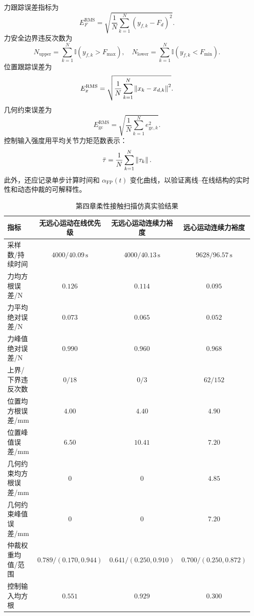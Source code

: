 力跟踪误差指标为
\begin{equation}
  E_F^{\mathrm{RMS}}=\sqrt{\frac{1}{N}\sum_{k=1}^{N}(y_{f,k}-F_d)^2} .
  \label{eq:ch4_force_rmse}
\end{equation}
力安全边界违反次数为
\begin{equation}
  N_{\mathrm{upper}}=\sum_{k=1}^{N}\mathbb{I}(y_{f,k}>F_{\max}),
  \quad
  N_{\mathrm{lower}}=\sum_{k=1}^{N}\mathbb{I}(y_{f,k}<F_{\min}) .
  \label{eq:ch4_violation_count}
\end{equation}
位置跟踪误差为
\begin{equation}
  E_x^{\mathrm{RMS}}=\sqrt{\frac{1}{N}\sum_{k=1}^{N}\left\lVert x_k-x_{d,k}\right\rVert^2} .
  \label{eq:ch4_position_rmse}
\end{equation}
几何约束误差为
\begin{equation}
  E_{\mathrm{gc}}^{\mathrm{RMS}}=\sqrt{\frac{1}{N}\sum_{k=1}^{N}e_{\mathrm{gc},k}^2} .
  \label{eq:ch4_gc_rmse}
\end{equation}
控制输入强度用平均关节力矩范数表示：
\begin{equation}
  \bar\tau=\frac{1}{N}\sum_{k=1}^{N}\left\lVert \tau_k\right\rVert .
  \label{eq:ch4_tau_metric}
\end{equation}
此外，还应记录单步计算时间和 $\alpha_{\mathrm{FP}}(t)$ 变化曲线，以验证离线--在线结构的实时性和动态仲裁的可解释性。

\begin{table}[H]
\centering
\caption{第四章柔性接触扫描仿真实验结果}
\label{tab:ch4_result_template}
\scriptsize
\begin{tabular}{lccc}
\toprule
指标 & 无远心运动在线优先级 & 无远心运动连续力裕度 & 远心运动连续力裕度 \\
\midrule
采样数/持续时间 & $4000/40.09\,\mathrm{s}$ & $4000/40.13\,\mathrm{s}$ & $9628/96.57\,\mathrm{s}$ \\
力均方根误差/N & $0.126$ & $0.114$ & $0.095$ \\
力平均绝对误差/N & $0.073$ & $0.065$ & $0.052$ \\
力峰值绝对误差/N & $0.990$ & $0.960$ & $0.968$ \\
上界/下界违反次数 & $0/18$ & $0/3$ & $62/152$ \\
位置均方根误差/mm & $4.00$ & $4.40$ & $4.90$ \\
位置峰值误差/mm & $6.50$ & $10.41$ & $7.20$ \\
几何约束均方根误差/mm & $0$ & $0$ & $4.85$ \\
几何约束峰值误差/mm & $0$ & $0$ & $7.20$ \\
仲裁权重均值/范围 & $0.789/(0.170,0.944)$ & $0.641/(0.250,0.910)$ & $0.700/(0.250,0.872)$ \\
控制输入均方根 & $0.551$ & $0.929$ & $0.300$ \\
\bottomrule
\end{tabular}
\end{table}

